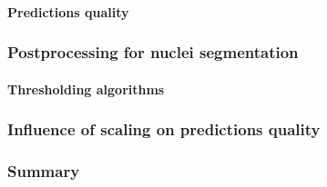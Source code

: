         \paragraph{Predictions quality}
              
    \subsubsection{Postprocessing for nuclei segmentation}
        
        \paragraph{Thresholding algorithms}
        
    \subsubsection{Influence of scaling on predictions quality}
        
    \subsubsection{Summary}
        